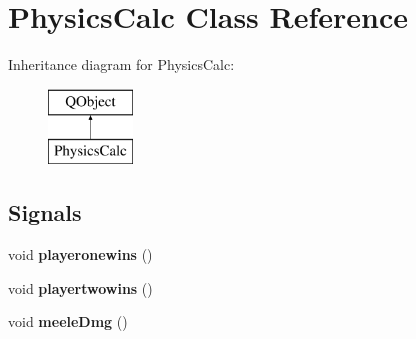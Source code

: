 \hypertarget{class_physics_calc}{}\section{Physics\+Calc Class Reference}
\label{class_physics_calc}
Inheritance diagram for Physics\+Calc\+:\begin{figure}[H]
\begin{center}
\leavevmode
\includegraphics[height=2.000000cm]{class_physics_calc}
\end{center}
\end{figure}
\subsection*{Signals}
\begin{DoxyCompactItemize}
\item 
void {\bfseries playeronewins} ()\hypertarget{class_physics_calc_a6790d05bf566005c0f8f4fb979eeabae}{}\label{class_physics_calc_a6790d05bf566005c0f8f4fb979eeabae}

\item 
void {\bfseries playertwowins} ()\hypertarget{class_physics_calc_aee47b83ee796e172207ef43885fe1e11}{}\label{class_physics_calc_aee47b83ee796e172207ef43885fe1e11}

\item 
void {\bfseries meele\+Dmg} ()\hypertarget{class_physics_calc_a869e988d2f13341a0e0fcd22a99963aa}{}\label{class_physics_calc_a869e988d2f13341a0e0fcd22a99963aa}

\end{DoxyCompactItemize}
